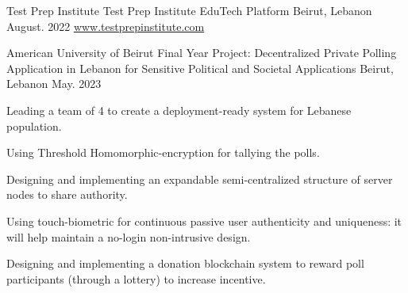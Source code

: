 

\begin{cventries}


\cventry
    {Test Prep Institute} %
    {Test Prep Institute EduTech Platform} %
    {Beirut, Lebanon} %
    {August. 2022} %
    {
    \hyperlink{https://www.testprepinstitute.com}{www.testprepinstitute.com}
    }
    
  \cventry
    {American University of Beirut} %
    {Final Year Project: Decentralized Private Polling Application in Lebanon for Sensitive Political and Societal Applications} %
    {Beirut, Lebanon} %
    {May. 2023} %
    {
      \begin{cvitems} %
        \item Leading a team of 4 to create a deployment-ready system for Lebanese population.
        \item Using Threshold Homomorphic-encryption for tallying the polls.
        \item Designing and implementing an expandable semi-centralized structure of server nodes to share authority.
        \item Using touch-biometric for continuous passive user authenticity and uniqueness: it will help maintain a no-login non-intrusive design. 
        \item Designing and implementing a donation blockchain system to reward poll participants (through a lottery) to increase incentive.
      \end{cvitems}
    }


\end{cventries}
